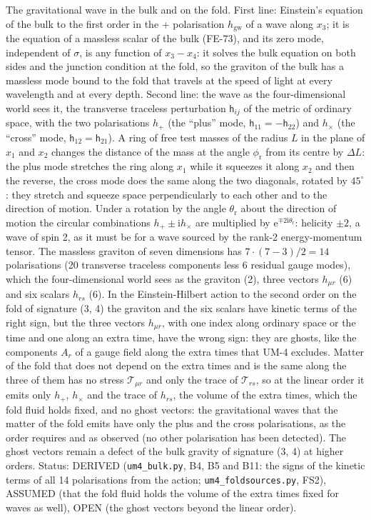 \documentclass[
  10pt,
]{article}
\begin{document}
The gravitational wave in the bulk and on the fold. First line:
Einstein's equation of the bulk to the first order in the + polarisation
\(h_{\mathrm{gw}}\) of a wave along \(x_3\); it is the equation of a
massless scalar of the bulk (FE-73), and its zero mode, independent of
\(\sigma\), is any function of \(x_3 - x_4\): it solves the bulk
equation on both sides and the junction condition at the fold, so the
graviton of the bulk has a massless mode bound to the fold that travels
at the speed of light at every wavelength and at every depth. Second
line: the wave as the four-dimensional world sees it, the transverse
traceless perturbation \(\mathsf{h}_{ij}\) of the metric of ordinary
space, with the two polarisations \(h_{+}\) (the ``plus'' mode,
\(\mathsf{h}_{11} = -\mathsf{h}_{22}\)) and \(h_{\times}\) (the
``cross'' mode, \(\mathsf{h}_{12} = \mathsf{h}_{21}\)). A ring of free
test masses of the radius \(L\) in the plane of \(x_1\) and \(x_2\)
changes the distance of the mass at the angle \(\phi_{\mathrm{r}}\) from
its centre by \(\Delta L\): the plus mode stretches the ring along
\(x_1\) while it squeezes it along \(x_2\) and then the reverse, the
cross mode does the same along the two diagonals, rotated by
\(45^\circ\): they stretch and squeeze space perpendicularly to each
other and to the direction of motion. Under a rotation by the angle
\(\theta_{\mathrm{r}}\) about the direction of motion the circular
combinations \(h_{+} \pm \mathrm{i}h_{\times}\) are multiplied by
\(\mathrm{e}^{\mp2\mathrm{i}\theta_{\mathrm{r}}}\): helicity \(\pm2\), a
wave of spin 2, as it must be for a wave sourced by the rank-2
energy-momentum tensor. The massless graviton of seven dimensions has
\(7\cdot(7 - 3)/2 = 14\) polarisations (20 transverse traceless
components less 6 residual gauge modes), which the four-dimensional
world sees as the graviton (2), three vectors \(h_{\mu r}\) (6) and six
scalars \(h_{rs}\) (6). In the Einstein-Hilbert action to the second
order on the fold of signature (3, 4) the graviton and the six scalars
have kinetic terms of the right sign, but the three vectors
\(h_{\mu r}\), with one index along ordinary space or the time and one
along an extra time, have the wrong sign: they are ghosts, like the
components \(A_r\) of a gauge field along the extra times that UM-4
excludes. Matter of the fold that does not depend on the extra times and
is the same along the three of them has no stress
\(\mathcal{T}_{\mu r}\) and only the trace of \(\mathcal{T}_{rs}\), so
at the linear order it emits only \(h_{+}\), \(h_{\times}\) and the
trace of \(h_{rs}\), the volume of the extra times, which the fold fluid
holds fixed, and no ghost vectors: the gravitational waves that the
matter of the fold emits have only the plus and the cross polarisations,
as the order requires and as observed (no other polarisation has been
detected). The ghost vectors remain a defect of the bulk gravity of
signature (3, 4) at higher orders. Status: DERIVED
(\texttt{um4\_bulk.py}, B4, B5 and B11: the signs of the kinetic terms
of all 14 polarisations from the action; \texttt{um4\_foldsources.py},
FS2), ASSUMED (that the fold fluid holds the volume of the extra times
fixed for waves as well), OPEN (the ghost vectors beyond the linear
order).
\end{document}
